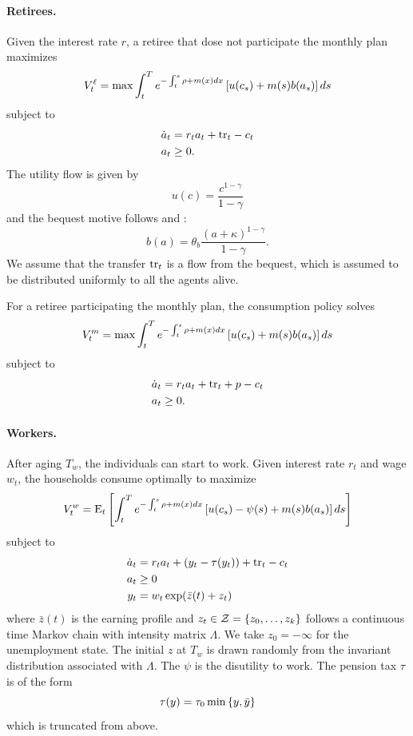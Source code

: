 \documentclass[a4paper, 12pt]{article}
\begin{document}
\paragraph{Retirees.} 
Given the interest rate $r$, a retiree that dose not 
participate the monthly plan maximizes 
\begin{equation}
    V_t^{\ell} = \max \int_t^T e^{-\int_t^s \rho + m(x)dx}\left[ {u(c_s) + m(s)b(a_s)} \right]ds
\end{equation}
subject to 
\begin{align}
    \dot{a}_t &= r_ta_t + \mathrm{tr}_t - c_t \\ 
    a_t &\geq 0. 
\end{align}
The utility flow is given by 
\begin{equation}
    u(c) = \frac{c^{1-\gamma}}{1-\gamma}
\end{equation} 
and the bequest motive follows \cite{denardi2004} and 
\cite{french2011}: 
\begin{equation}
    b(a) = \theta_b\frac{(a + \kappa)^{1-\gamma}}{1-\gamma}.
\end{equation}
We assume that the transfer $\mathrm{tr}_t$ is a flow from the bequest, 
which is assumed to be distributed uniformly to all the agents alive. 

For a retiree participating the monthly plan, the consumption 
policy solves 
\begin{equation}
    V_t^{m} = \max \int_t^Te^{-\int_t^s \rho + m(x)dx}\left[ {u(c_s) + m(s)b(a_s)} \right]ds
\end{equation}
subject to 
\begin{align}
    \dot{a}_t &= r_ta_t + \mathrm{tr}_t + p - c_t \\ 
    a_t &\geq 0. 
\end{align}

\paragraph{Workers.}
After aging $T_w$, the individuals can start to work. 
Given interest rate $r_t$ and wage $w_t$, the households 
consume optimally to maximize
\begin{equation}
    V_t^w = \operatorname{E}_t\left[ {\int_t^Te^{-\int_t^s \rho + m(x)dx}\left[ {u(c_s) - \psi(s) + m(s)b(a_s)} \right]ds} \right]
\end{equation}
subject to 
\begin{align}
    \dot{a}_t &= r_ta_t + (y_t-\tau(y_t)) + \mathrm{tr}_t - c_t \\
    a_t &\geq 0 \\ 
    y_t &= w_t\exp(\bar{z}(t) + z_t)
\end{align}
where $\bar{z}(t)$ is the earning profile and $z_t\in\mathcal{Z} 
= \left\{ {z_0,\ldots,z_k} \right\}$ follows a continuous time Markov chain with 
intensity matrix $\Lambda$. We take $z_0 = -\infty$ for the unemployment 
state. The initial $z$ at $T_w$ is drawn randomly from the 
invariant distribution associated with $\Lambda$. The 
$\psi$ is the disutility to work. The pension tax $\tau$ 
is of the form 
\begin{equation}
    \tau(y) = \tau_0\min\left\{ {y, \bar{y}} \right\}
\end{equation}
which is truncated from above.
\end{document}
